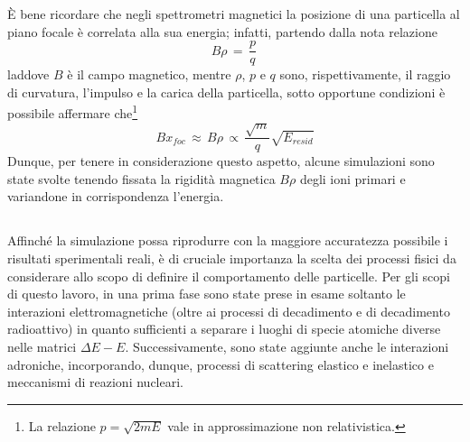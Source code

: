 È bene ricordare che negli spettrometri magnetici la posizione di una particella al piano focale è correlata alla sua energia; infatti, partendo dalla nota relazione
\begin{equation} \label{eq:legge_spettrometri}
B  \rho \, = \,  \frac{p}{q} \, 
\end{equation}
laddove $B$ è il campo magnetico, mentre $\rho$, $p$ e $q$ sono, rispettivamente, il raggio di curvatura, l'impulso e la carica della particella, sotto opportune condizioni è possibile affermare che\footnote{La relazione $p = \sqrt{2 m E}$ vale in approssimazione non relativistica.}
\begin{equation} \label{eq:legge_spettrometri_approx}
B x_{foc} \, \approx \, B  \rho  \, \propto \,  \frac{\sqrt{m}}{q} \sqrt{E_{resid}}
\end{equation}
Dunque, per tenere in considerazione questo aspetto, alcune simulazioni sono state svolte tenendo fissata la rigidità magnetica $B \rho$ degli ioni primari e variandone in corrispondenza l'energia.



\subsection{}


Affinché la simulazione possa riprodurre con la maggiore accuratezza possibile i risultati sperimentali reali, è di cruciale importanza la scelta dei processi fisici da considerare allo scopo di definire il comportamento delle particelle.
Per gli scopi di questo lavoro, in una prima fase sono state prese in esame soltanto le interazioni elettromagnetiche (oltre ai processi di decadimento e di decadimento radioattivo) in quanto sufficienti a separare i luoghi di specie atomiche diverse nelle matrici $\Delta E - E$.
Successivamente, sono state aggiunte anche le interazioni adroniche, incorporando, dunque, processi di scattering elastico e inelastico e meccanismi di reazioni nucleari.

